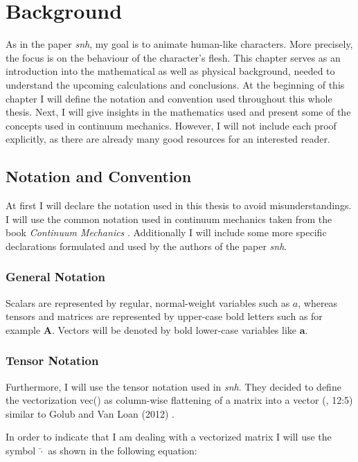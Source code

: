 \chapter{Background} \label{c:Background}
As in the paper \textit{\acrshort{snh}}, my goal is to animate human-like characters. More precisely, the focus is on the behaviour of the character's flesh. This chapter serves as an introduction into the mathematical as well as physical background, needed to understand the upcoming calculations and conclusions. At the beginning of this chapter I will define the notation and convention used throughout this whole thesis. Next, I will give insights in the mathematics used and present some of the concepts used in continuum mechanics. However, I will not include each proof explicitly, as there are already many good resources for an interested reader.

\section{Notation and Convention}
At first I will declare the notation used in this thesis to avoid misunderstandings. I will use the common notation used in continuum mechanics taken from the book \textit{Continuum Mechanics} \cite{Spencer1980}. Additionally I will include some more specific declarations formulated and used by the authors of the paper \textit{\acrshort{snh}}.


\subsection{General Notation}
Scalars are represented by regular, normal-weight variables such as $a$, whereas tensors and matrices are represented by upper-case bold letters such as for example $\textbf{A}$. Vectors will be denoted by bold lower-case variables like $\textbf{a}$. 


\subsection{Tensor Notation}
Furthermore, I will use the tensor notation used in \textit{\acrshort{snh}}. They decided to define the vectorization vec(\cdot) as column-wise flattening of a matrix into a vector (\cite{Smith:2018:SNF:3191713.3180491}, 12:5) similar to Golub and Van Loan (2012) \cite{golub2012matrix}.

In order to indicate that I am dealing with a vectorized matrix I will use the symbol $\check{\cdot}$ as shown in the following equation:

